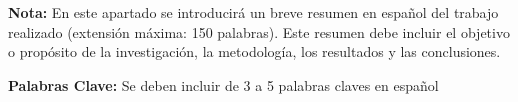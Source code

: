 {\bf Nota:} En este apartado se introducirá un breve resumen en 
español del trabajo realizado (extensión máxima: 150 palabras). 
Este resumen debe incluir el objetivo o propósito de la investigación, 
la metodología, los resultados y las conclusiones.

{\bf Palabras Clave:} Se deben incluir de 3 a 5 palabras claves en español

